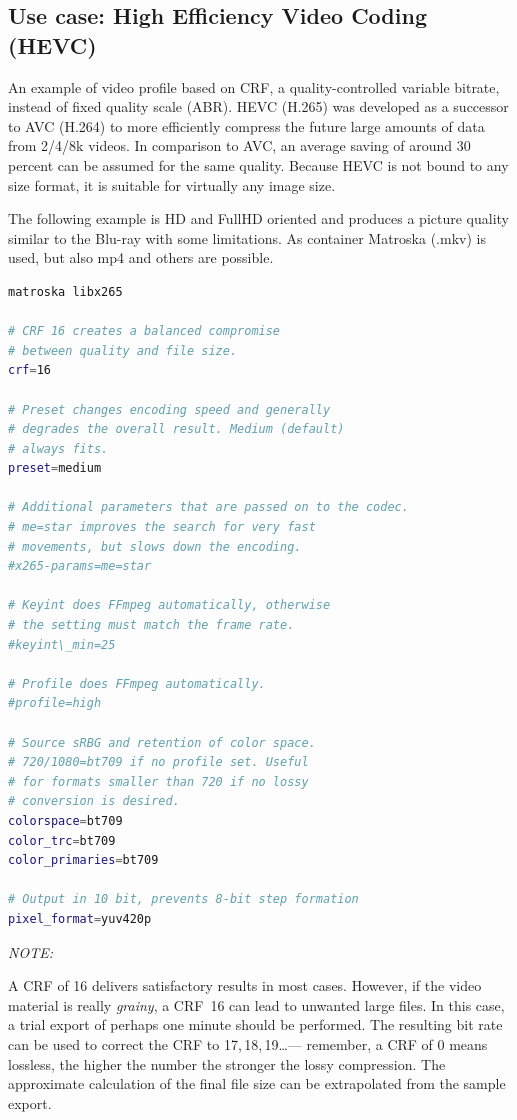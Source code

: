 \subsection{Use case: High Efficiency Video Coding (HEVC)}%
\label{sub:use_case_hevc}

An example of video profile based on CRF, a quality-controlled
variable bitrate, instead of fixed quality scale (ABR).
HEVC (H.265) was developed as a successor to AVC (H.264) to more
efficiently compress the future large amounts of data from 2/4/8k
videos.
In comparison to AVC, an average saving of around 30 percent can be
assumed for the same quality.
Because HEVC is not bound to any size format, it is suitable for
virtually any image size.

The following example is HD and FullHD oriented and produces a
picture quality similar to the Blu-ray with some limitations.
As container Matroska (.mkv) is used, but also mp4 and others are
possible.

\vspace{2ex} \begin{lstlisting}[language=Bash]
matroska libx265

# CRF 16 creates a balanced compromise
# between quality and file size. 
crf=16

# Preset changes encoding speed and generally
# degrades the overall result. Medium (default)
# always fits.
preset=medium

# Additional parameters that are passed on to the codec.
# me=star improves the search for very fast
# movements, but slows down the encoding.
#x265-params=me=star

# Keyint does FFmpeg automatically, otherwise
# the setting must match the frame rate.
#keyint\_min=25

# Profile does FFmpeg automatically.
#profile=high

# Source sRBG and retention of color space.
# 720/1080=bt709 if no profile set. Useful
# for formats smaller than 720 if no lossy
# conversion is desired.
colorspace=bt709
color_trc=bt709
color_primaries=bt709

# Output in 10 bit, prevents 8-bit step formation
pixel_format=yuv420p
\end{lstlisting}

\noindent \textit{NOTE:}

A CRF of 16 delivers satisfactory results in most cases. However, if
the video material is really \emph{grainy}, a CRF~16 can lead to unwanted large files.  In this case, a trial export of perhaps one minute should be performed. The resulting bit rate can be used to correct the CRF to 17,\,18,\,19\ldots --- remember, a CRF of 0 means lossless, the higher the number the stronger the lossy compression. The approximate calculation of the final file size can be extrapolated from the sample export.

